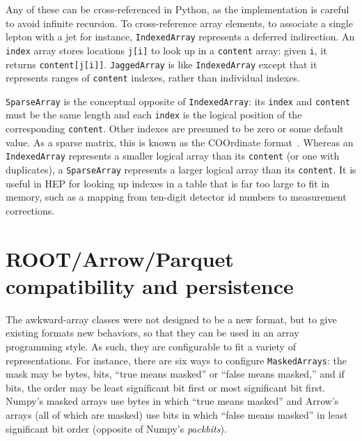 \documentclass{webofc}
\begin{document}
Any of these can be cross-referenced in Python, as the implementation is careful to avoid infinite recursion. To cross-reference array elements, to associate a single lepton with a jet for instance, {\tt\small IndexedArray} represents a deferred indirection. An {\tt\small index} array stores locations {\tt\small j[i]} to look up in a {\tt\small content} array: given {\tt\small i}, it returns {\tt\small content[j[i]]}. {\tt\small JaggedArray} is like {\tt\small IndexedArray} except that it represents ranges of {\tt\small content} indexes, rather than individual indexes.

{\tt\small SparseArray} is the conceptual opposite of {\tt\small IndexedArray}: its {\tt\small index} and {\tt\small content} must be the same length and each {\tt\small index} is the logical position of the corresponding {\tt\small content}. Other indexes are presumed to be zero or some default value. As a sparse matrix, this is known as the COOrdinate format~\cite{coo}. Whereas an {\tt\small IndexedArray} represents a smaller logical array than its {\tt\small content} (or one with duplicates), a {\tt\small SparseArray} represents a larger logical array than its {\tt\small content}. It is useful in HEP for looking up indexes in a table that is far too large to fit in memory, such as a mapping from ten-digit detector id numbers to measurement corrections.

\section{ROOT/Arrow/Parquet compatibility and persistence}

The awkward-array classes were not designed to be a new format, but to give existing formats new behaviors, so that they can be used in an array programming style. As such, they are configurable to fit a variety of representations. For instance, there are six ways to configure {\tt\small MaskedArrays}: the mask may be bytes, bits, ``true means masked'' or ``false means masked,'' and if bits, the order may be least significant bit first or most significant bit first. Numpy's masked arrays use bytes in which ``true means masked'' and Arrow's arrays (all of which are masked) use bits in which ``false means masked'' in least significant bit order (opposite of Numpy's {\it packbits}).
\end{document}

